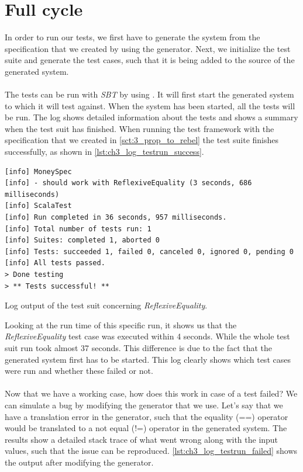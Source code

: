 \section{Full cycle}
\label{sct:ch3_full_cycle}
In order to run our tests, we first have to generate the system from the specification that we created by using the generator. Next, we initialize the test suite and generate the test cases, such that it is being added to the source of the generated system.\\
\\
The tests can be run with \textit{SBT} by using . It will first start the generated system to which it will test against. When the system has been started, all the tests will be run. The log shows detailed information about the tests and shows a summary when the test suit has finished. When running the test framework with the specification that we created in \autoref{sct:3_prop_to_rebel} the test suite finishes successfully, as shown in \autoref{lst:ch3_log_testrun_success}.
\FloatBarrier
\begin{sourcecode}[h!]
\begin{lstlisting}[language=Log]
[info] MoneySpec
[info] - should work with ReflexiveEquality (3 seconds, 686 milliseconds)
[info] ScalaTest
[info] Run completed in 36 seconds, 957 milliseconds.
[info] Total number of tests run: 1
[info] Suites: completed 1, aborted 0
[info] Tests: succeeded 1, failed 0, canceled 0, ignored 0, pending 0
[info] All tests passed.
> Done testing
> ** Tests successful! **
\end{lstlisting}
\caption{Log output of the test suit concerning \textit{ReflexiveEquality}.}
\label{lst:ch3_log_testrun_success}
\end{sourcecode}
\FloatBarrier
Looking at the run time of this specific run, it shows us that the \textit{ReflexiveEquality} test case was executed within 4 seconds. While the whole test suit run took almost 37 seconds. This difference is due to the fact that the generated system first has to be started. This log clearly shows which test cases were run and whether these failed or not.\\
\\
Now that we have a working case, how does this work in case of a test failed? We can simulate a bug by modifying the generator that we use. Let's say that we have a translation error in the generator, such that the equality (==) operator would be translated to a not equal (!=) operator in the generated system. The results show a detailed stack trace of what went wrong along with the input values, such that the issue can be reproduced. \autoref{lst:ch3_log_testrun_failed} shows the output after modifying the generator.
